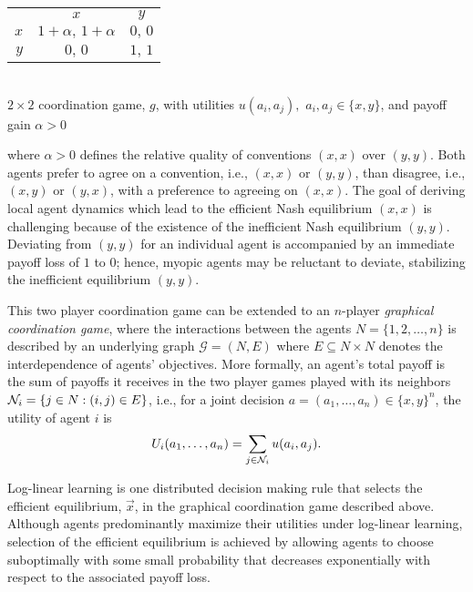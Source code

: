 \begin{center}
\begin{tabular}{r|c|c|}
\multicolumn{1}{r}{}	&\multicolumn{1}{c}{$x$}	&\multicolumn{1}{c}{$y$}\\
\cline{2-3}$x$			&$1+\alpha,\,1+\alpha$	&$0,\,0$\\
\cline{2-3}$y$			&$0,\,0$				&$1,\,1$\\
\cline{2-3}
\end{tabular}\\
\medskip
$2\times 2$ coordination game, $g$, with utilities $u(a_i,a_j),$ $a_i,a_j\in\{x,y\}$, and payoff gain $\alpha>0$
\end{center}
where $\alpha > 0$ defines the relative quality of conventions $(x,x)$ over $(y,y)$.  Both agents prefer to agree on a convention, i.e., $(x,x)$ or $(y,y)$, than disagree, i.e., $(x,y)$ or $(y,x)$, with a preference to agreeing on $(x,x)$.  
The goal of deriving local agent dynamics which lead to the efficient Nash equilibrium $(x,x)$ is challenging because of the existence of the inefficient Nash equilibrium $(y,y)$.  Deviating from $(y,y)$ for an individual agent is accompanied by an immediate payoff loss of $1$ to $0$; hence, myopic agents may be reluctant to deviate, stabilizing the inefficient equilibrium $(y,y)$.

This two player coordination game can be extended to an $n$-player \emph{graphical coordination game}\cite{Kearns2001,Young2011, Montanari2010}, where the interactions between the agents $N=\{1, 2, \dots, n\}$ is described by an underlying graph $\mathcal{G} = (N,E)$ where $E \subseteq N\times N$ denotes the interdependence of agents' objectives.  More formally, an agent's total payoff is the sum of payoffs it receives in the two player games played with its neighbors ${\cal N}_i = \{j \in N : (i,j) \in E\}$, i.e., for a joint decision $a = (a_1, \dots, a_n) \in \{x,y\}^n$, the utility of agent $i$ is
%
\begin{equation}\label{e:original utility}
%
U_i(a_1, \dots, a_n) = \sum_{j \in {\cal N}_i} u(a_i, a_j).
%
\end{equation}

Log-linear learning \cite{Blume1993, Shah2010} is one distributed decision making rule that selects the efficient equilibrium, $\vec{x}$, in the graphical coordination game described above. Although agents predominantly maximize their utilities under log-linear learning, selection of the efficient equilibrium is achieved by allowing agents to choose suboptimally with some small probability that decreases exponentially with respect to the associated payoff loss. 

